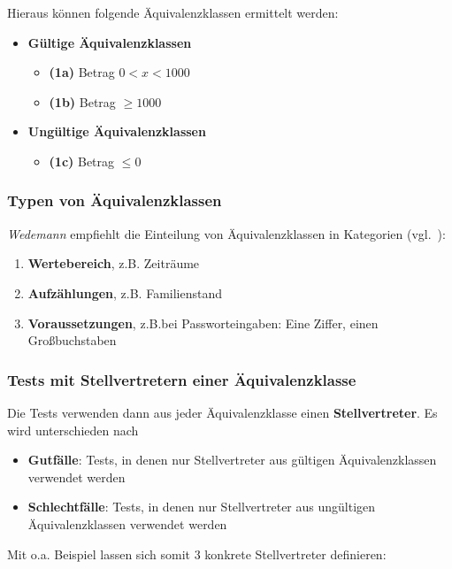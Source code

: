 Hieraus können folgende Äquivalenzklassen ermittelt werden:

\begin{itemize}
    \item \textbf{Gültige Äquivalenzklassen}
    \begin{itemize}
        \item[] \textbf{(1a)} Betrag $0 < x < 1000 $
        \item[] \textbf{(1b)} Betrag $\geq 1000 $
    \end{itemize}
    \item \textbf{Ungültige Äquivalenzklassen}
    \begin{itemize}
      \item[] \textbf{(1c)} Betrag $\leq 0 $
    \end{itemize}
\end{itemize}

\subsubsection*{Typen von Äquivalenzklassen}
\textit{Wedemann} empfiehlt die Einteilung von Äquivalenzklassen in Kategorien (vgl.~\cite[43]{Wed09c}):

\begin{enumerate}
    \item \textbf{Wertebereich}, z.B. Zeiträume
    \item \textbf{Aufzählungen}, z.B. Familienstand
    \item \textbf{Voraussetzungen}, z.B.bei Passworteingaben: Eine Ziffer, einen Großbuchstaben
\end{enumerate}

\subsubsection*{Tests mit Stellvertretern einer Äquivalenzklasse}
Die Tests verwenden dann aus jeder Äquivalenzklasse einen \textbf{Stellvertreter}.
Es wird unterschieden nach

\begin{itemize}
    \item \textbf{Gutfälle}: Tests, in denen nur Stellvertreter aus gültigen Äquivalenzklassen verwendet werden
    \item \textbf{Schlechtfälle}: Tests, in denen nur Stellvertreter aus ungültigen Äquivalenzklassen verwendet werden
\end{itemize}

\noindent
Mit o.a. Beispiel lassen sich somit 3 konkrete Stellvertreter definieren:

